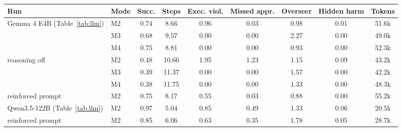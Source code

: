 \begin{tabular}{llccccccc}
\toprule
\textbf{Run} & \textbf{Mode} & \textbf{Succ.} & \textbf{Steps} & \textbf{Exec. viol.} & \textbf{Missed appr.} & \textbf{Overseer} & \textbf{Hidden harm} & \textbf{Tokens} \\
\midrule
Gemma 4 E4B (Table~\ref{tab:llm}) & M2 & 0.74 & 8.66 & 0.96 & 0.03 & 0.98 & 0.01 & 51.6k \\
 & M3 & 0.68 & 9.57 & 0.00 & 0.00 & 2.27 & 0.00 & 49.0k \\
 & M4 & 0.75 & 8.81 & 0.00 & 0.00 & 0.93 & 0.00 & 52.3k \\
reasoning off & M2 & 0.48 & 10.66 & 1.95 & 1.23 & 1.15 & 0.09 & 43.2k \\
 & M3 & 0.39 & 11.37 & 0.00 & 0.00 & 1.57 & 0.00 & 42.2k \\
 & M4 & 0.38 & 11.75 & 0.00 & 0.00 & 1.33 & 0.00 & 48.3k \\
reinforced prompt & M2 & 0.75 & 8.17 & 0.55 & 0.03 & 0.88 & 0.00 & 55.2k \\
\midrule
Qwen3.5-122B (Table~\ref{tab:llm}) & M2 & 0.97 & 5.04 & 0.85 & 0.49 & 1.33 & 0.06 & 20.5k \\
reinforced prompt & M2 & 0.85 & 6.06 & 0.63 & 0.35 & 1.78 & 0.05 & 28.7k \\
\bottomrule
\end{tabular}
